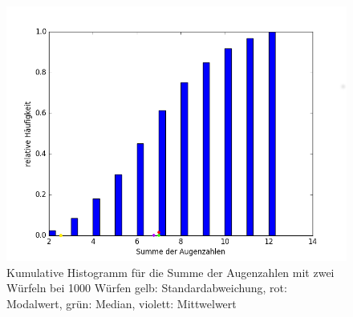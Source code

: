 \begin{figure}
	\includegraphics[width=1.0\textwidth]{A04_histo2.png}
	\caption{Kumulative Histogramm für die Summe der Augenzahlen mit zwei Würfeln bei 1000 Würfen \newline gelb: Standardabweichung, rot: Modalwert, grün: Median, violett: Mittwelwert}
\end{figure}
